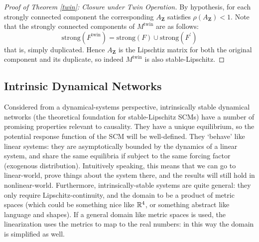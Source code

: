 \documentclass[12pt]{article}
\begin{document}
\begin{proof}[Proof of Theorem \ref{twin}: Closure under Twin Operation]
By hypothesis, for each strongly connected component the corresponding $A_\mathbf{Z}$ satisfies $\rho(A_\mathbf{Z})<1$.
Note that the strongly connected components of $M^{\text{twin}}$ are as follows:
\[
\text{strong}(F^{\text{twin}})=\text{strong}(F)\cup\text{strong}(F^\prime)
\]
that is, simply duplicated.
Hence $A_\mathbf{Z}$ is the Lipschtiz matrix for both the original component and its duplicate, so indeed $M^{\text{twin}}$ is also stable-Lipschitz.
\end{proof}



\subsection{Intrinsic Dynamical Networks}\label{intrinsic-appendix}

Considered from a dynamical-systems perspective, intrinsically stable dynamical networks (the theoretical foundation for stable-Lipschitz SCMs) have a number of promising properties relevant to causality. They have a unique equilibrium, so the potential response function of the SCM will be well-defined. They `behave’ like linear systems: they are asymptotically bounded by the dynamics of a linear system, and share the same equilibria if subject to the same forcing factor (exogenous distribution). Intuitively speaking, this means that we can go to linear-world, prove things about the system there, and the results will still hold in nonlinear-world. Furthermore, intrinsically-stable systems are quite general: they only require Lipschitz-continuity, and the domain to be a product of metric spaces (which could be something nice like $\mathbb{R}^4$, or something abstract like language and shapes). If a general domain like metric spaces is used, the linearization uses the metrics to map to the real numbers: in this way the domain is simplified as well.
\end{document}

